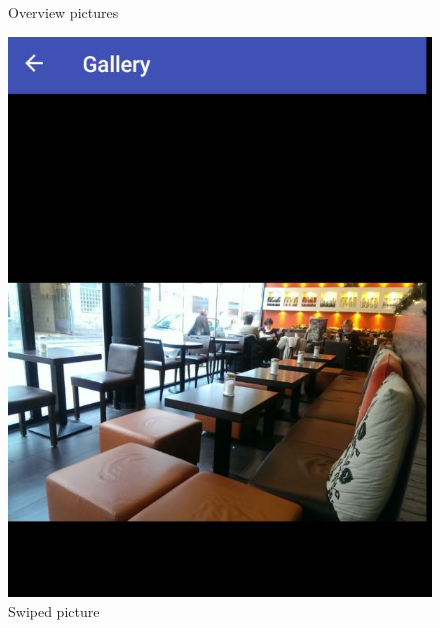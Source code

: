 \begin{figure}[!htb]
    \caption{Overview pictures}\label{fig:overimages}
	\includegraphics[width=\linewidth]{images/swipeimage.jpg}
	\caption{Swiped picture}\label{fig:swipeimage}
	\endminipage\hfill

\end{figure}
	


